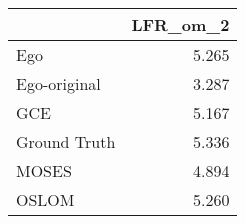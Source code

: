 \begin{tabular}{lr}
\toprule
{} & LFR_om_2 \\
\midrule
Ego          &    5.265 \\
Ego-original &    3.287 \\
GCE          &    5.167 \\
Ground Truth &    5.336 \\
MOSES        &    4.894 \\
OSLOM        &    5.260 \\
\bottomrule
\end{tabular}
